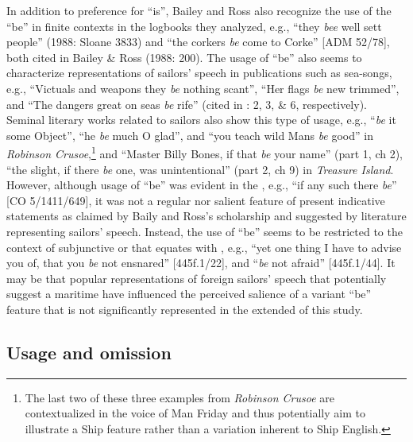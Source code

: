 In addition to preference for “is”, Bailey and Ross also recognize the use of the   “be” in finite contexts in the logbooks they analyzed, e.g., “they \textit{bee} well sett people” (1988: Sloane 3833) and “the corkers \textit{be} come to Corke” [ADM 52/78], both cited in Bailey \& Ross (1988: 200). The usage of  “be” also seems to characterize representations of sailors’ speech in publications such as sea-songs, e.g., “Victuals and weapons they \textit{be} nothing scant”, “Her flags \textit{be} new trimmed”, and “The dangers great on seas \textit{be} rife” (cited in \citealt{Palmer1986}: 2, 3, \& 6, respectively). Seminal literary works related to sailors also show this type of usage, e.g., “\textit{be} it some Object”, “he \textit{be} much O glad”, and “you teach wild Mans \textit{be} good” in  \textit{Robinson Crusoe},\footnote{The last two of these three examples from \textit{Robinson Crusoe} are contextualized in the voice of Man Friday and thus potentially aim to illustrate a Ship  feature rather than a variation inherent to Ship English.}  and “Master Billy Bones, if that \textit{be} your name” (part 1, ch 2), “the slight, if there \textit{be} one, was unintentional” (part 2, ch 9) in  \textit{Treasure Island}. However, although usage of  “be” was evident in the , e.g., “if any such there \textit{be}” [CO 5/1411/649], it was not a regular nor salient feature of present indicative statements as claimed by Baily and Ross’s scholarship and suggested by literature representing sailors’ speech. Instead, the use of  “be” seems to be restricted to the context of subjunctive or  that equates with , e.g., “yet one thing I have to advise you of, that you \textit{be} not ensnared” [445f.1/22], and “\textit{be} not afraid” [445f.1/44]. It may be that popular representations of foreign sailors’ speech that potentially suggest a maritime  have influenced the perceived salience of a variant  “be” feature that is not significantly represented in the extended  of this study. 

\subsection{{Usage and omission}  }\label{sec:6.3.2}

